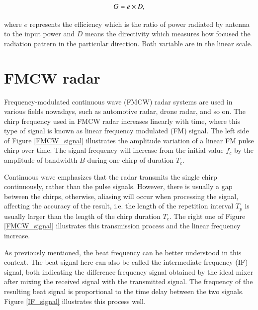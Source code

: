 \documentclass[12pt,DIV14,BCOR12mm,a4paper,footinclude=false,headinclude,parskip=half-,twoside,openright,cleardoublepage=empty,toc=index,bibliography=totoc,listof=totoc]{scrreprt}
\numberwithin{equation}{chapter}
\begin{document}
\begin{equation}
    \centering
    G = e \times D,
    \label{antenna gain formula}
\end{equation}

where $e$ represents the efficiency which is the ratio of power radiated by antenna to the input power and $D$ means the directivity which measures how focused the radiation pattern in the particular direction. Both variable are in the linear scale.

\section{FMCW radar} \label{FMCW radar}
Frequency-modulated continuous wave (FMCW) radar systems \cite{hafner_parameter_2021} are used in various fields nowadays, such as automotive radar, drone radar, and so on. The chirp frequency used in FMCW radar increases linearly with time, where this type of signal is known as linear frequency modulated (FM) signal. The left side of Figure \ref{FMCW_signal} illustrates the amplitude variation of a linear FM pulse chirp over time. The signal frequency will increase from the initial value $f_c$ by the amplitude of bandwidth $B$ during one chirp of duration $T_c$.

Continuous wave emphasizes that the radar transmits the single chirp continuously, rather than the pulse signals. However, there is usually a gap between the chirps, otherwise, aliasing will occur when processing the signal, affecting the accuracy of the result, i.e. the length of the repetition interval $T_p$ is usually larger than the length of the chirp duration $T_c$. The right one of Figure \ref{FMCW_signal} illustrates this transmission process and the linear frequency increase.

As previously mentioned, the beat frequency can be better understood in this context. The beat signal here can also be called the intermediate frequency (IF) signal, both indicating the difference frequency signal obtained by the ideal mixer after mixing the received signal with the transmitted signal. The frequency of the resulting beat signal is proportional to the time delay between the two signals. Figure \ref{IF_signal} illustrates this process well.
\end{document}
